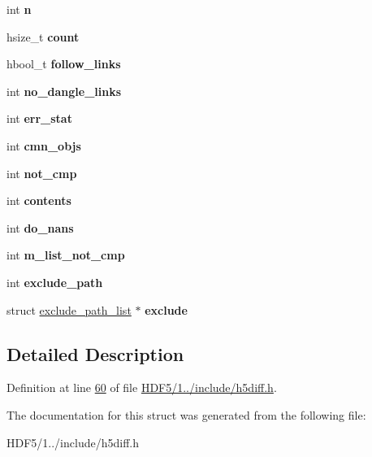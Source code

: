 \begin{DoxyCompactItemize}
int {\bfseries n}
\item 
\mbox{\label{structdiff__opt__t_a6e1b1172c9f86cd5053b9cb66dd92d6d}} 
hsize\+\_\+t {\bfseries count}
\item 
\mbox{\label{structdiff__opt__t_a8beda9b0528d0cdf5af4d62ad551cbd2}} 
hbool\+\_\+t {\bfseries follow\+\_\+links}
\item 
\mbox{\label{structdiff__opt__t_aaa6bfd5d1133f8604331b6da040f89e8}} 
int {\bfseries no\+\_\+dangle\+\_\+links}
\item 
\mbox{\label{structdiff__opt__t_adbb2819a1c32e61753cc74114b7648bc}} 
int {\bfseries err\+\_\+stat}
\item 
\mbox{\label{structdiff__opt__t_a01895d4e288904fe91c1edec0c0fc1ec}} 
int {\bfseries cmn\+\_\+objs}
\item 
\mbox{\label{structdiff__opt__t_af62b86add352bee37679b285b588dccb}} 
int {\bfseries not\+\_\+cmp}
\item 
\mbox{\label{structdiff__opt__t_ad9b13c52a924b076c96963a285660493}} 
int {\bfseries contents}
\item 
\mbox{\label{structdiff__opt__t_a5bd4f5fdc05d701db592b57b317483ce}} 
int {\bfseries do\+\_\+nans}
\item 
\mbox{\label{structdiff__opt__t_ae1d37654eb88ddca4a1aa31c9675d6ec}} 
int {\bfseries m\+\_\+list\+\_\+not\+\_\+cmp}
\item 
\mbox{\label{structdiff__opt__t_a44db818fc20797cca6fa8536bfd665d7}} 
int {\bfseries exclude\+\_\+path}
\item 
\mbox{\label{structdiff__opt__t_a6af9ab01480ed645fb647e836c426446}} 
struct \hyperlink{structexclude__path__list}{exclude\+\_\+path\+\_\+list} $\ast$ {\bfseries exclude}
\end{DoxyCompactItemize}


\subsection{Detailed Description}


Definition at line \hyperlink{_h_d_f5_21_810_81_2include_2h5diff_8h_source_l00060}{60} of file \hyperlink{_h_d_f5_21_810_81_2include_2h5diff_8h_source}{H\+D\+F5/1../include/h5diff.\+h}.



The documentation for this struct was generated from the following file\+:\begin{DoxyCompactItemize}
\item 
H\+D\+F5/1../include/h5diff.\+h\end{DoxyCompactItemize}
